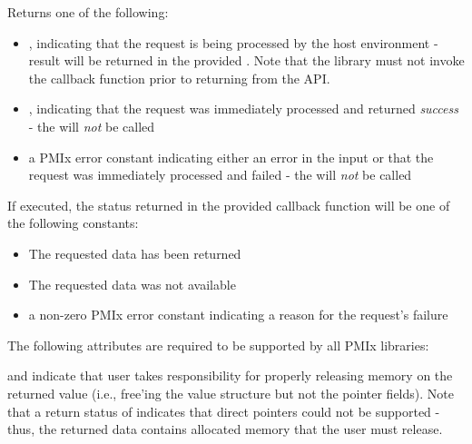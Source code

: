 \begin{arglist}
\end{arglist}

Returns one of the following:

\begin{itemize}
    \item {}, indicating that the request is being processed by the host environment - result will be returned in the provided . Note that the library must not invoke the callback function prior to returning from the \ac{API}.
    \item {}, indicating that the request was immediately processed and returned \textit{success} - the  will \textit{not} be called
    \item a PMIx error constant indicating either an error in the input or that the request was immediately processed and failed - the  will \textit{not} be called
\end{itemize}

If executed, the status returned in the provided callback function will be one of the following constants:

\begin{itemize}
\item {} The requested data has been returned
\item {} The requested data was not available
\item a non-zero \ac{PMIx} error constant indicating a reason for the request's failure
\end{itemize}

\reqattrstart
The following attributes are required to be supported by all \ac{PMIx} libraries:

and indicate that user takes responsibility for properly releasing memory on the returned value (i.e., free'ing the value structure but not the pointer fields). Note that a return status of  indicates that direct pointers could not be supported - thus, the returned data contains allocated memory that the user must release.
\pastePRIAttributeItemEnd

